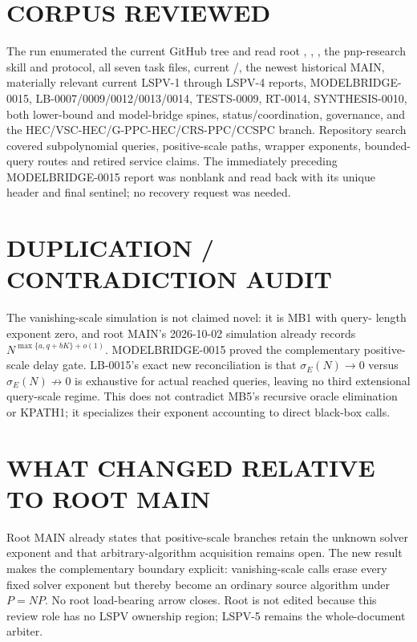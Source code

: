 \documentclass[11pt]{article}
\begin{document}
\section{CORPUS REVIEWED}

The run enumerated the current GitHub tree and read root ,
, , the pnp-research skill and protocol, all
seven task files, current /, the newest
historical MAIN, materially relevant current LSPV-1 through LSPV-4 reports,
MODELBRIDGE-0015, LB-0007/0009/0012/0013/0014, TESTS-0009, RT-0014,
SYNTHESIS-0010, both lower-bound and model-bridge spines, status/coordination,
governance, and the HEC/VSC-HEC/G-PPC-HEC/CRS-PPC/CCSPC branch.  Repository
search covered subpolynomial queries, positive-scale paths, wrapper exponents,
bounded-query routes and retired service claims.  The immediately preceding
MODELBRIDGE-0015 report was nonblank and read back with its unique header and
final sentinel; no recovery request was needed.

\section{DUPLICATION / CONTRADICTION AUDIT}

The vanishing-scale simulation is not claimed novel: it is MB1 with query-
length exponent zero, and root MAIN's 2026-10-02 simulation already records
$N^{\max\{a,q+bK\}+o(1)}$.  MODELBRIDGE-0015 proved the complementary
positive-scale delay gate.  LB-0015's exact new reconciliation is that
$\sigma_E(N)\to0$ versus $\sigma_E(N)\not\to0$ is exhaustive for actual
reached queries, leaving no third extensional query-scale regime.  This does
not contradict MB5's recursive oracle elimination or KPATH1; it specializes
their exponent accounting to direct black-box calls.

\section{WHAT CHANGED RELATIVE TO ROOT MAIN}

Root MAIN already states that positive-scale branches retain the unknown
solver exponent and that arbitrary-algorithm acquisition remains open.  The
new result makes the complementary boundary explicit: vanishing-scale calls
erase every fixed solver exponent but thereby become an ordinary source
algorithm under $P=NP$.  No root load-bearing arrow closes.  Root
 is not edited because this review role has no LSPV ownership
region; LSPV-5 remains the whole-document arbiter.
\end{document}
